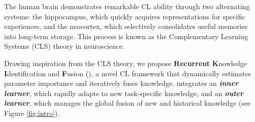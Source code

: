 

The human brain demonstrates remarkable CL ability through two alternating systems: the hippocampus, which quickly acquires representations for specific experiences, and the neocortex, which selectively consolidates useful memories into long-term storage. 
This process is known as the Complementary Learning Systems (CLS) theory \cite{mcclelland1995there} in neuroscience.


Drawing inspiration from the CLS theory, we propose \textbf{Recurrent} \textbf{K}nowledge \textbf{I}dentification and \textbf{F}usion ({\ouralg}), a novel CL framework that dynamically estimates parameter importance and iteratively fuses knowledge.
{\ouralg} integrates an \textit{\textbf{inner learner}}, which rapidly adapts to new task-specific knowledge, and an \textit{\textbf{outer learner}}, which manages the global fusion of new and historical knowledge (see Figure \ref{fig:intro}).


